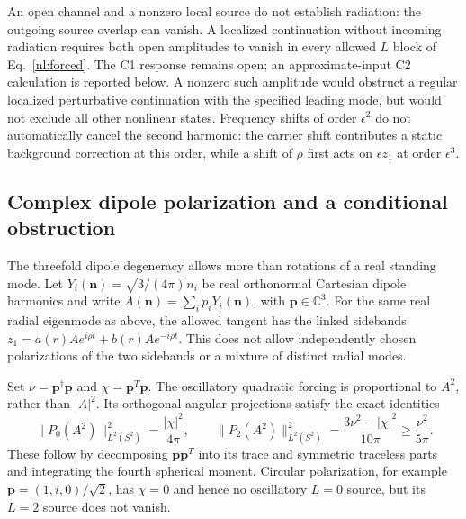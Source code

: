 An open channel and a nonzero local source do not establish radiation:
the outgoing source overlap can vanish. A localized continuation without
incoming radiation requires both open amplitudes to vanish in every
allowed $L$ block of Eq.~\eqref{nl:forced}. The C1 response remains open;
an approximate-input C2 calculation is reported below. A nonzero such amplitude would obstruct
a regular localized perturbative continuation with the specified leading
mode, but would not exclude all other nonlinear states. Frequency shifts
of order $\epsilon^2$ do not automatically cancel the second harmonic:
the carrier shift contributes a static background correction at this
order, while a shift of $\rho$ first acts on $\epsilon z_1$ at order
$\epsilon^3$.

\subsection{Complex dipole polarization and a conditional obstruction}
\label{nl:polarization}
The threefold dipole degeneracy allows more than rotations of a real
standing mode. Let $Y_i(\boldsymbol n)=\sqrt{3/(4\pi)}n_i$ be real
orthonormal Cartesian dipole harmonics and write
$A(\boldsymbol n)=\sum_i p_iY_i(\boldsymbol n)$, with
$\boldsymbol p\in\mathbb C^3$. For the same real radial eigenmode as above,
the allowed tangent has the linked sidebands
$z_1=a(r)A e^{i\rho t}+b(r)\overline A e^{-i\rho t}$.
This does not allow independently chosen polarizations of the two
sidebands or a mixture of distinct radial modes.

Set $\nu=\boldsymbol p^\dagger\boldsymbol p$ and
$\chi=\boldsymbol p^T\boldsymbol p$. The oscillatory quadratic forcing
is proportional to $A^2$, rather than $|A|^2$. Its orthogonal angular
projections satisfy the exact identities
\begin{equation}
 \|P_0(A^2)\|_{L^2(S^2)}^2=\frac{|\chi|^2}{4\pi},\qquad
 \|P_2(A^2)\|_{L^2(S^2)}^2
 =\frac{3\nu^2-|\chi|^2}{10\pi}\geq\frac{\nu^2}{5\pi}.
 \label{nl:polarization-norms}
\end{equation}
These follow by decomposing $\boldsymbol p\boldsymbol p^T$ into its trace
and symmetric traceless parts and integrating the fourth spherical
moment. Circular polarization, for example
$\boldsymbol p=(1,i,0)/\sqrt2$, has $\chi=0$ and hence no oscillatory
$L=0$ source, but its $L=2$ source does not vanish.

